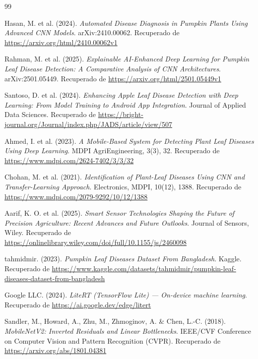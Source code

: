 \documentclass[12pt,a4paper]{article}
\begin{document}
\newpage
{}
\begin{thebibliography}{99}

Hasan, M. et al. (2024). \textit{Automated Disease Diagnosis in Pumpkin Plants
Using Advanced CNN Models}. arXiv:2410.00062.
Recuperado de \url{https://arxiv.org/html/2410.00062v1}

Rahman, M. et al. (2025). \textit{Explainable AI-Enhanced Deep Learning for
Pumpkin Leaf Disease Detection: A Comparative Analysis of CNN Architectures}.
arXiv:2501.05449.
Recuperado de \url{https://arxiv.org/html/2501.05449v1}

Santoso, D. et al. (2024). \textit{Enhancing Apple Leaf Disease Detection with
Deep Learning: From Model Training to Android App Integration}. Journal of
Applied Data Sciences.
Recuperado de \url{https://bright-journal.org/Journal/index.php/JADS/article/view/507}

Ahmed, I. et al. (2023). \textit{A Mobile-Based System for Detecting Plant Leaf
Diseases Using Deep Learning}. MDPI AgriEngineering, 3(3), 32.
Recuperado de \url{https://www.mdpi.com/2624-7402/3/3/32}

Chohan, M. et al. (2021). \textit{Identification of Plant-Leaf Diseases Using CNN
and Transfer-Learning Approach}. Electronics, MDPI, 10(12), 1388.
Recuperado de \url{https://www.mdpi.com/2079-9292/10/12/1388}

Aarif, K. O. et al. (2025). \textit{Smart Sensor Technologies Shaping the Future
of Precision Agriculture: Recent Advances and Future Outlooks}. Journal of
Sensors, Wiley.
Recuperado de \url{https://onlinelibrary.wiley.com/doi/full/10.1155/js/2460098}

tahmidmir. (2023). \textit{Pumpkin Leaf Diseases Dataset From Bangladesh}.
Kaggle.
Recuperado de \url{https://www.kaggle.com/datasets/tahmidmir/pumpkin-leaf-diseases-dataset-from-bangladesh}

Google LLC. (2024). \textit{LiteRT (TensorFlow Lite) --- On-device machine
learning}.
Recuperado de \url{https://ai.google.dev/edge/litert}

Sandler, M., Howard, A., Zhu, M., Zhmoginov, A. \& Chen, L.-C. (2018).
\textit{MobileNetV2: Inverted Residuals and Linear Bottlenecks}. IEEE/CVF
Conference on Computer Vision and Pattern Recognition (CVPR).
Recuperado de \url{https://arxiv.org/abs/1801.04381}


\end{thebibliography}
\end{document}
